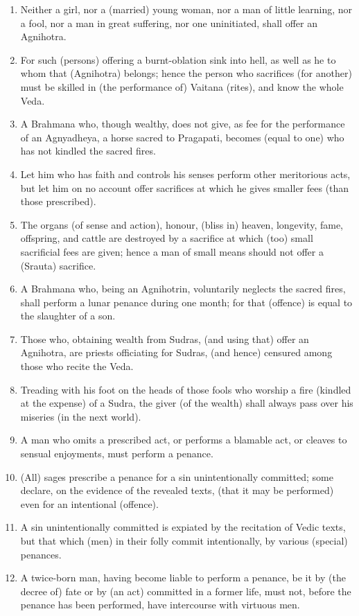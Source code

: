 \begin{enumerate}
\item Neither a girl, nor a (married) young woman, nor a man of little learning, nor a fool, nor a man in great suffering, nor one uninitiated, shall offer an Agnihotra.
\item For such (persons) offering a burnt-oblation sink into hell, as well as he to whom that (Agnihotra) belongs; hence the person who sacrifices (for another) must be skilled in (the performance of) Vaitana (rites), and know the whole Veda.
\item A Brahmana who, though wealthy, does not give, as fee for the performance of an Agnyadheya, a horse sacred to Pragapati, becomes (equal to one) who has not kindled the sacred fires.
\item Let him who has faith and controls his senses perform other meritorious acts, but let him on no account offer sacrifices at which he gives smaller fees (than those prescribed).
\item The organs (of sense and action), honour, (bliss in) heaven, longevity, fame, offspring, and cattle are destroyed by a sacrifice at which (too) small sacrificial fees are given; hence a man of small means should not offer a (Srauta) sacrifice.
\item A Brahmana who, being an Agnihotrin, voluntarily neglects the sacred fires, shall perform a lunar penance during one month; for that (offence) is equal to the slaughter of a son.
\item Those who, obtaining wealth from Sudras, (and using that) offer an Agnihotra, are priests officiating for Sudras, (and hence) censured among those who recite the Veda.
\item Treading with his foot on the heads of those fools who worship a fire (kindled at the expense) of a Sudra, the giver (of the wealth) shall always pass over his miseries (in the next world).
\item A man who omits a prescribed act, or performs a blamable act, or cleaves to sensual enjoyments, must perform a penance.
\item (All) sages prescribe a penance for a sin unintentionally committed; some declare, on the evidence of the revealed texts, (that it may be performed) even for an intentional (offence).
\item A sin unintentionally committed is expiated by the recitation of Vedic texts, but that which (men) in their folly commit intentionally, by various (special) penances.
\item A twice-born man, having become liable to perform a penance, be it by (the decree of) fate or by (an act) committed in a former life, must not, before the penance has been performed, have intercourse with virtuous men.

\end{enumerate}
